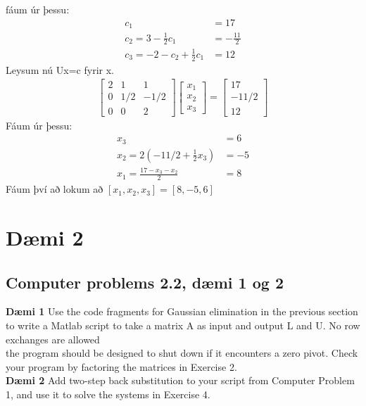 \documentclass[11pt]{article}
\begin{document}
fáum úr þessu:
\begin{align*}
c_1 &= 17\\
c_2 = 3 - \frac 12 c_1 &= -\frac{11}{2}\\
c_3 = -2 - c_2 + \frac 12 c_1 &= 12
\end{align*}
Leysum nú Ux=c fyrir x.
\begin{align*}
\begin{bmatrix} %
2 & 1 & 1\\
0 & 1/2 & -1/2\\
0 & 0 & 2
\end{bmatrix}
\begin{bmatrix}
x_1\\
x_2\\
x_3
\end{bmatrix}
=
\begin{bmatrix}
17\\
-11/2\\
12
\end{bmatrix}
\end{align*}
Fáum úr þessu:
\begin{align*}
x_3 &= 6\\
x_2 = 2(-11/2 + \frac{1}{2} x_3) &= -5\\
x_1 = \frac{17-x_3-x_2}{2} &= 8
\end{align*}
Fáum því að lokum að $[x_1, x_2, x_3] = [8, -5 , 6]$

\section*{Dæmi 2}
\subsection*{Computer problems 2.2, dæmi 1 og 2}

\textbf{Dæmi 1} Use the code fragments for Gaussian elimination in the previous section to write a Matlab
script to take a matrix A as input and output L and U. No row exchanges are allowed\\
the program should be designed to shut down if it encounters a zero pivot. Check your program by factoring the matrices in Exercise 2.\\

\noindent \textbf{Dæmi 2} Add two-step back substitution to your script from Computer Problem 1, and use it to solve the
systems in Exercise 4.
\end{document}
